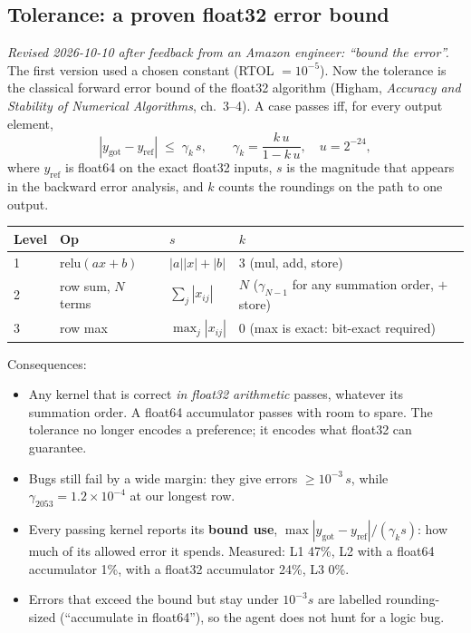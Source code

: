 \documentclass[11pt]{article}
\begin{document}
\subsection{Tolerance: a proven float32 error bound}
\label{sec:tol}

\emph{Revised 2026-10-10 after feedback from an Amazon engineer: ``bound the error''.} The first
version used a chosen constant (RTOL $=10^{-5}$). Now the tolerance is the classical forward error
bound of the float32 algorithm (Higham, \emph{Accuracy and Stability of Numerical Algorithms},
ch.~3--4). A case passes iff, for every output element,
\[
  |y_{\text{got}} - y_{\text{ref}}| \;\le\; \gamma_k\, s,
  \qquad \gamma_k = \frac{k\,u}{1-k\,u},\quad u = 2^{-24},
\]
where $y_{\text{ref}}$ is float64 on the exact float32 inputs, $s$ is the magnitude that appears in
the backward error analysis, and $k$ counts the roundings on the path to one output.

\begin{tabular}{@{}llll@{}}
\toprule
Level & Op & $s$ & $k$ \\
\midrule
1 & $\mathrm{relu}(ax+b)$ & $|a||x|+|b|$ & 3 (mul, add, store) \\
2 & row sum, $N$ terms & $\sum_j |x_{ij}|$ & $N$ ($\gamma_{N-1}$ for any summation order, $+$ store) \\
3 & row max & $\max_j |x_{ij}|$ & 0 (max is exact: bit-exact required) \\
\bottomrule
\end{tabular}

\medskip
Consequences:
\begin{itemize}
  \item Any kernel that is correct \emph{in float32 arithmetic} passes, whatever its summation
        order. A float64 accumulator passes with room to spare. The tolerance no longer encodes a
        preference; it encodes what float32 can guarantee.
  \item Bugs still fail by a wide margin: they give errors $\ge 10^{-3}\,s$, while
        $\gamma_{2053} = 1.2\times10^{-4}$ at our longest row.
  \item Every passing kernel reports its \textbf{bound use}, $\max|y_{\text{got}}-y_{\text{ref}}|
        / (\gamma_k s)$: how much of its allowed error it spends. Measured: L1 47\%, L2 with a
        float64 accumulator 1\%, with a float32 accumulator 24\%, L3 0\%.
  \item Errors that exceed the bound but stay under $10^{-3}s$ are labelled rounding-sized
        (``accumulate in float64''), so the agent does not hunt for a logic bug.
\end{itemize}
\end{document}
